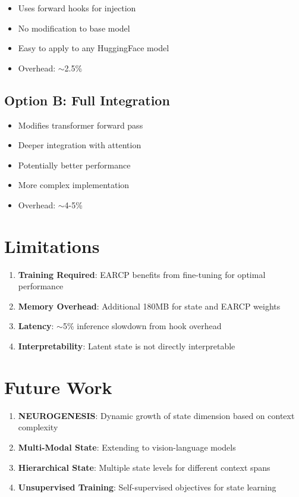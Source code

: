 \documentclass[11pt,a4paper]{article}
\begin{document}
\begin{itemize}
    \item Uses forward hooks for injection
    \item No modification to base model
    \item Easy to apply to any HuggingFace model
    \item Overhead: $\sim$2.5\%
\end{itemize}

\subsection{Option B: Full Integration}

\begin{itemize}
    \item Modifies transformer forward pass
    \item Deeper integration with attention
    \item Potentially better performance
    \item More complex implementation
    \item Overhead: $\sim$4-5\%
\end{itemize}

\section{Limitations}

\begin{enumerate}
    \item \textbf{Training Required}: EARCP benefits from fine-tuning for optimal performance
    \item \textbf{Memory Overhead}: Additional 180MB for state and EARCP weights
    \item \textbf{Latency}: $\sim$5\% inference slowdown from hook overhead
    \item \textbf{Interpretability}: Latent state is not directly interpretable
\end{enumerate}

\section{Future Work}

\begin{enumerate}
    \item \textbf{NEUROGENESIS}: Dynamic growth of state dimension based on context complexity
    \item \textbf{Multi-Modal State}: Extending to vision-language models
    \item \textbf{Hierarchical State}: Multiple state levels for different context spans
    \item \textbf{Unsupervised Training}: Self-supervised objectives for state learning
\end{enumerate}
\end{document}
